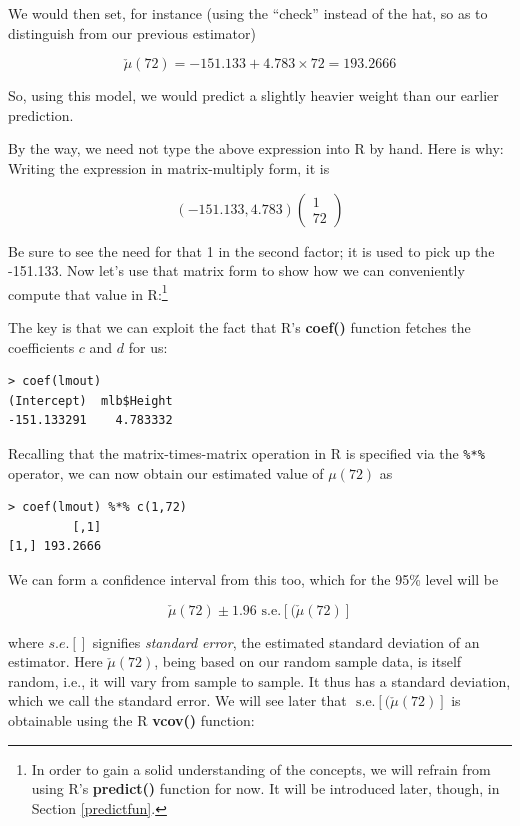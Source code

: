 We would then set, for instance (using the ``check'' instead of the hat, so
as to distinguish from our previous estimator)

\begin{equation}
\check{\mu}(72) = -151.133 + 4.783 \times 72 = 193.2666
\end{equation}

So, using this model, we would predict a slightly heavier weight than
our earlier prediction.

By the way, we need not type the above expression into R by hand.  Here
is why: Writing the expression in matrix-multiply form, it is

\begin{equation}
\label{firstdotprod}
(-151.133,4.783)
\left (
\begin{array}{r}
1 \\
72
\end{array}
\right )
\end{equation}

Be sure to see the need for that 1 in the second factor; it is used to
pick up the -151.133.  Now let's use that matrix form to show how we
can conveniently compute that value in R:\footnote{In order to gain a
solid understanding of the concepts, we will refrain from using R's
{\bf predict()} function for now.  It will be introduced later, though,
in Section \ref{predictfun}.} 

The key is that we can exploit the fact that R's {\bf coef()} function
fetches the coefficients $c$ and $d$ for us:

\begin{lstlisting}
> coef(lmout)
(Intercept)  mlb$Height 
-151.133291    4.783332 
\end{lstlisting}

Recalling that the matrix-times-matrix operation in R is specified via
the \lstinline{%*%} operator, we can now obtain our estimated value of
$\mu(72)$ as

\begin{lstlisting}
> coef(lmout) %*% c(1,72)
         [,1]
[1,] 193.2666
\end{lstlisting}

We can form a confidence interval from this too, which for the 95\%
level will be

\begin{equation}
\check{\mu}(72) \pm 1.96 \textrm{ s.e.}[(\check{\mu}(72)]
\end{equation}

where $s.e.[]$ signifies {\it standard error}, the estimated standard
deviation of an estimator.  Here $\check{\mu}(72)$, being based on our
random sample data, is itself random, i.e., it will vary from sample to
sample.  It thus has a standard deviation, which we call the standard
error.  We will see later that $\textrm{ s.e.}[(\check{\mu}(72)]$
is obtainable using the R {\bf vcov()} function:

